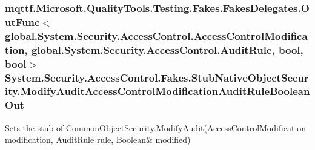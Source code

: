\hypertarget{class_system_1_1_security_1_1_access_control_1_1_fakes_1_1_stub_native_object_security_acbe061142c8700734e8c7f5e7cd0ca27}{
\subsubsection[{Modify\-Audit\-Access\-Control\-Modification\-Audit\-Rule\-Boolean\-Out}]{\setlength{\rightskip}{0pt plus 5cm}mqttf.\-Microsoft.\-Quality\-Tools.\-Testing.\-Fakes.\-Fakes\-Delegates.\-Out\-Func$<$global.\-System.\-Security.\-Access\-Control.\-Access\-Control\-Modification, global.\-System.\-Security.\-Access\-Control.\-Audit\-Rule, bool, bool$>$ System.\-Security.\-Access\-Control.\-Fakes.\-Stub\-Native\-Object\-Security.\-Modify\-Audit\-Access\-Control\-Modification\-Audit\-Rule\-Boolean\-Out}}\label{class_system_1_1_security_1_1_access_control_1_1_fakes_1_1_stub_native_object_security_acbe061142c8700734e8c7f5e7cd0ca27}


Sets the stub of Common\-Object\-Security.\-Modify\-Audit(Access\-Control\-Modification modification, Audit\-Rule rule, Boolean\& modified)

